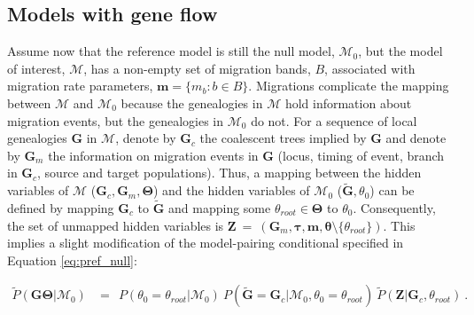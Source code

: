 \documentclass[11pt]{article}
\newcommand{\vect}[1]{\boldsymbol{\mathbf{#1}}}
\newcommand{\X}{\vect{X}}
\newcommand{\M}{\mathcal{M}}
\newcommand{\G}{\vect{G}}
\newcommand{\T}{\vect{\Theta}}
\newcommand{\GT}{\G\T}
\newcommand{\Pref}{\widetilde{P}}
\newcommand{\Gref}{\widetilde{\G}}
\newcommand{\1}{\mathbbm{1}}
\newcommand{\Z}{\vect{Z}}
\newcommand{\troot}{\theta_{root}}
\newcommand{\Gc}{\G_c}
\newcommand{\Gm}{\G_m}
\newcommand{\taus}{\vect\tau}
\newcommand{\thetas}{\vect\theta}
\newcommand{\migs}{\vect{m}}
\begin{document}
\subsection{Models with gene flow}

Assume now that the reference model is still the null model, $\M_0$, but the model of interest, $\M$, has a non-empty
set of migration bands, $B$, associated with migration rate parameters, $\migs=\{m_b:b\in B\}$.
%
Migrations complicate the mapping between $\M$ and $\M_0$ because the genealogies in $\M$ hold information
about migration events, but the genealogies in $\M_0$ do not.
%
For a sequence of local genealogies $\G$ in $\M$, denote by $\Gc$ the coalescent trees implied by $\G$
and denote by $\Gm$ the information on migration events in $\G$ (locus, timing of event, branch in $\Gc$, source and target populations).
%
Thus, a mapping between the hidden variables of $\M$ ($\Gc,\Gm,\T$) and the hidden variables of $\M_0$ ($\Gref,\theta_0$) can be defined by
mapping $\Gc$ to $\Gref$ and mapping some $\troot\in\T$ to $\theta_0$.
%
Consequently, the set of unmapped hidden variables is $\Z~=~ (\Gm,\taus,\migs,\thetas\setminus\{\troot\})$.
%
This implies a slight modification of the model-pairing conditional specified in Equation \ref{eq:pref_null}:
%
%
\begin{small}
\begin{align}
 \Pref(\GT|\M_0)
 &=~~ 
 P(\theta_0=\troot|\M_0)\  P(\Gref=\Gc|\M_0,\theta_0=\troot)\ \Pref(\Z|\Gc,\troot)  ~ .\label{eq:pref_mig}
\end{align}
\end{small}
\end{document}
